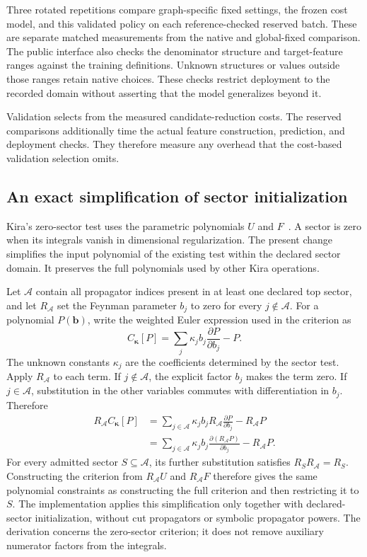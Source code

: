 Three rotated repetitions compare graph-specific fixed settings, the frozen cost model, and this validated policy on each reference-checked reserved batch. These are separate matched measurements from the native and global-fixed comparison. The public interface also checks the denominator structure and target-feature ranges against the training definitions. Unknown structures or values outside those ranges retain native choices. These checks restrict deployment to the recorded domain without asserting that the model generalizes beyond it.

Validation selects from the measured candidate-reduction costs. The reserved comparisons additionally time the actual feature construction, prediction, and deployment checks. They therefore measure any overhead that the cost-based validation selection omits.

\subsection{An exact simplification of sector initialization}
Kira's zero-sector test uses the parametric polynomials $U$ and $F$~\cite{Lee2014LiteRed,Kira3}. A sector is zero when its integrals vanish in dimensional regularization. The present change simplifies the input polynomial of the existing test within the declared sector domain. It preserves the full polynomials used by other Kira operations.

Let $\mathcal A$ contain all propagator indices present in at least one declared top sector, and let $R_{\mathcal A}$ set the Feynman parameter $b_j$ to zero for every $j\notin\mathcal A$. For a polynomial $P(\boldsymbol b)$, write the weighted Euler expression used in the criterion as
\begin{equation}
 C_{\boldsymbol\kappa}[P]
 =\sum_j\kappa_j b_j\frac{\partial P}{\partial b_j}-P.
 \label{eq:adaptive-euler}
\end{equation}
The unknown constants $\kappa_j$ are the coefficients determined by the sector test. Apply $R_{\mathcal A}$ to each term. If $j\notin\mathcal A$, the explicit factor $b_j$ makes the term zero. If $j\in\mathcal A$, substitution in the other variables commutes with differentiation in $b_j$. Therefore
\begin{align}
 R_{\mathcal A} C_{\boldsymbol\kappa}[P]
 &=\sum_{j\in\mathcal A}\kappa_j b_j R_{\mathcal A}\frac{\partial P}{\partial b_j}-R_{\mathcal A} P\nonumber\\
 &=\sum_{j\in\mathcal A}\kappa_j b_j\frac{\partial(R_{\mathcal A} P)}{\partial b_j}-R_{\mathcal A} P.
 \label{eq:adaptive-projection}
\end{align}
For every admitted sector $S\subseteq\mathcal A$, its further substitution satisfies $R_S R_{\mathcal A}=R_S$. Constructing the criterion from $R_{\mathcal A}U$ and $R_{\mathcal A}F$ therefore gives the same polynomial constraints as constructing the full criterion and then restricting it to $S$. The implementation applies this simplification only together with declared-sector initialization, without cut propagators or symbolic propagator powers. The derivation concerns the zero-sector criterion; it does not remove auxiliary numerator factors from the integrals.

